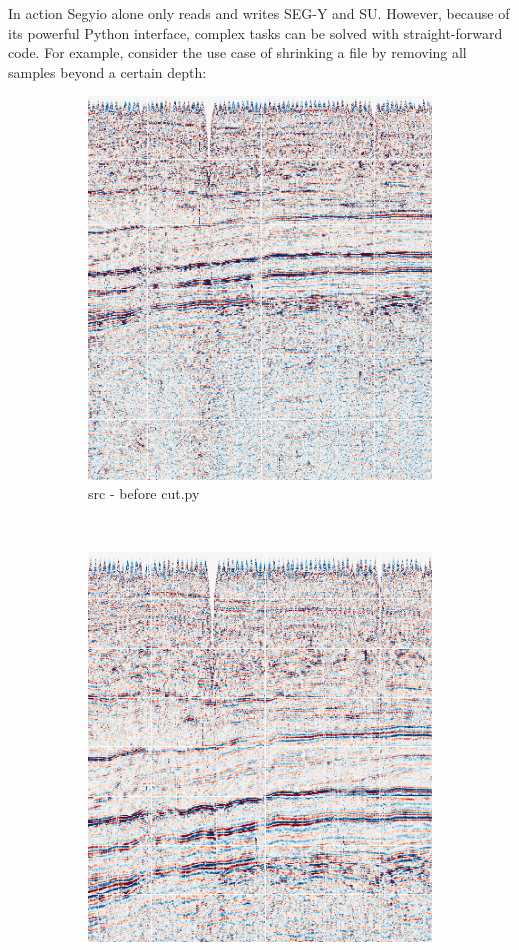 \documentclass[final]{beamer}
\begin{document}
\begin{frame}{}
\begin{columns}[t]
\begin{column}{\columnmargin}
    \begin{block}{\large In action}
        Segyio alone only reads and writes SEG-Y and SU. However, because of
        its powerful Python interface, complex tasks can be solved with
        straight-forward code. For example, consider the use case of shrinking
        a file by removing all samples beyond a certain depth:

        \begin{minipage}{0.90\textwidth}
        

        \begin{figure}[c]
            \begin{subfigure}{0.40\textwidth}
                \includegraphics{pre-cut.png}
                \caption{src - before cut.py}
            \end{subfigure}
            ~
            \begin{subfigure}{0.40\textwidth}
                \includegraphics{post-cut.png}

\end{subfigure}
\end{figure}
\end{minipage}
\end{block}
\end{column}
\end{columns}
\end{frame}
\end{document}
